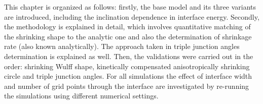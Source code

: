 This chapter is organized as follows: firstly, the base model and its three variants are introduced, including the inclination dependence in interface energy. Secondly, the methodology is explained in detail, which involves quantitative matching of the shrinking shape to the analytic one and also the determination of shrinkage rate (also known analytically). The approach taken in triple junction angles determination is explained as well. Then, the validations were carried out in the order: shrinking Wulff shape, kinetically compensated anisotropically shrinking circle and triple junction angles. For all simulations the effect of interface width and number of grid points through the interface are investigated by re-running the simulations using different numerical settings.


%
%
%

